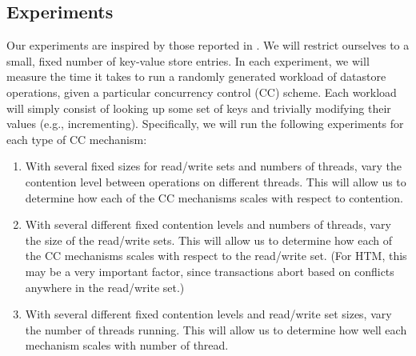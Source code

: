 \subsection{Experiments}
Our experiments are inspired by those reported in \citep{tran2010}. We will
restrict ourselves to a small, fixed number of key-value store entries. In each
experiment, we will measure the time it takes to run a randomly generated
workload of datastore operations, given a particular concurrency control (CC) scheme. Each workload will simply consist of looking up some set of keys and trivially modifying their values (e.g., incrementing). Specifically, we will run the following experiments for each type of CC mechanism:
\begin{enumerate}
\item With several fixed sizes for read/write sets and numbers of threads, vary the contention level between operations on different threads. This will allow us to determine how each of the CC mechanisms scales with respect to contention.
\item With several different fixed contention levels and numbers of threads, vary the size of the read/write sets. This will allow us to determine how each of the CC mechanisms scales with respect to the read/write set. (For HTM, this may be a very important factor, since transactions abort based on conflicts anywhere in the read/write set.)
\item With several different fixed contention levels and read/write set sizes,
    vary the number of threads running. This will allow us to determine how well
    each mechanism scales with number of thread.
\end{enumerate}

